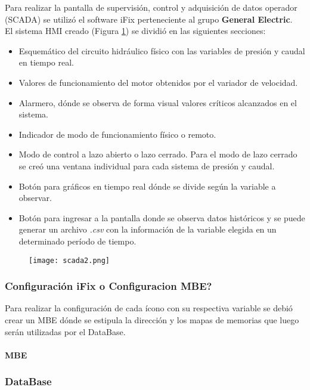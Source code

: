 Para realizar la pantalla de supervisión, control y adquisición de datos operador (SCADA) se utilizó el software iFix perteneciente al grupo \textbf{General Electric}.\\
El sistema HMI creado (Figura \ref{fig:scada1}) se dividió en las siguientes secciones:
\begin{itemize}
	\item Esquemático del circuito hidráulico físico con las variables de presión y caudal en tiempo real.
	\item Valores de funcionamiento del motor obtenidos por el variador de velocidad.
	\item Alarmero, dónde se observa de forma visual valores críticos alcanzados en el sistema.
	\item Indicador de modo de funcionamiento físico o remoto.
	\item Modo de control a lazo abierto o lazo cerrado.
	\subitem Para el modo de lazo cerrado se creó una ventana individual para cada sistema de presión y caudal.
	\item Botón para gráficos en tiempo real dónde se divide según la variable a observar.
	\item Botón para ingresar a la pantalla donde se observa datos históricos y se puede generar un archivo \textit{.csv} con la información de la variable elegida en un determinado período de tiempo.
\end{itemize} 

\begin{figure}[htb]
	\centering
	\texttt{[image: scada2.png]}
	\label{fig:scada1}
\end{figure}


\subsubsection{Configuración iFix o Configuracion MBE?}
Para realizar la configuración de cada ícono con su respectiva variable se debió crear un MBE dónde se estipula la dirección y los mapas de memorias que luego serán utilizadas por el DataBase. 


\paragraph{MBE}
\subsubsection{DataBase}


